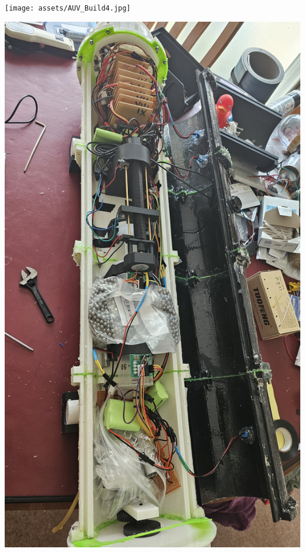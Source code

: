 \documentclass[11pt,a4paper,titlepage]{report}
\begin{document}
	\begin{center}
		\label{picture:images_build_4}
		\texttt{[image: assets/AUV\_Build4.jpg]}
	\end{center}
	\begin{center}
		\label{picture:images_build_5}
		\includegraphics[width=\linewidth]{assets/AUV_Build5.jpg}
	\end{center}
\end{document}
